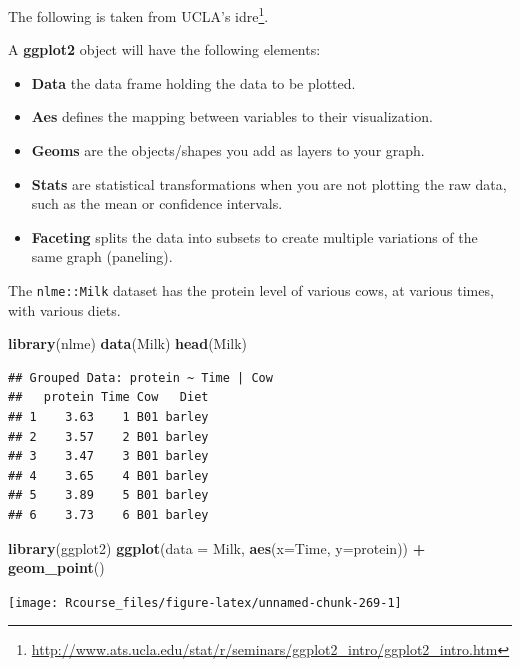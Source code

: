 \documentclass[]{book}
\newenvironment{Shaded}{\begin{snugshade}}{\end{snugshade}}
\newcommand{\DataTypeTok}[1]{\textcolor[rgb]{0.13,0.29,0.53}{#1}}
\newcommand{\KeywordTok}[1]{\textcolor[rgb]{0.13,0.29,0.53}{\textbf{#1}}}
\newcommand{\NormalTok}[1]{#1}
\newcommand{\OperatorTok}[1]{\textcolor[rgb]{0.81,0.36,0.00}{\textbf{#1}}}
\newcommand{\StringTok}[1]{\textcolor[rgb]{0.31,0.60,0.02}{#1}}
\providecommand{\tightlist}{%
  \setlength{\itemsep}{0pt}\setlength{\parskip}{0pt}}
\renewcommand{\href}[2]{#2\footnote{\url{#1}}}
\theoremstyle{definition}
\theoremstyle{definition}
\theoremstyle{definition}
\theoremstyle{remark}
\begin{document}
The following is taken from \href{http://www.ats.ucla.edu/stat/r/seminars/ggplot2_intro/ggplot2_intro.htm}{UCLA's idre}.

A \textbf{ggplot2} object will have the following elements:

\begin{itemize}
\tightlist
\item
  \textbf{Data} the data frame holding the data to be plotted.
\item
  \textbf{Aes} defines the mapping between variables to their visualization.
\item
  \textbf{Geoms} are the objects/shapes you add as layers to your graph.
\item
  \textbf{Stats} are statistical transformations when you are not plotting the raw data, such as the mean or confidence intervals.
\item
  \textbf{Faceting} splits the data into subsets to create multiple variations of the same graph (paneling).
\end{itemize}

The \texttt{nlme::Milk} dataset has the protein level of various cows, at various times, with various diets.

\begin{Shaded}
\begin{Highlighting}[]
\KeywordTok{library}\NormalTok{(nlme)}
\KeywordTok{data}\NormalTok{(Milk)}
\KeywordTok{head}\NormalTok{(Milk)}
\end{Highlighting}
\end{Shaded}

\begin{verbatim}
## Grouped Data: protein ~ Time | Cow
##   protein Time Cow   Diet
## 1    3.63    1 B01 barley
## 2    3.57    2 B01 barley
## 3    3.47    3 B01 barley
## 4    3.65    4 B01 barley
## 5    3.89    5 B01 barley
## 6    3.73    6 B01 barley
\end{verbatim}

\begin{Shaded}
\begin{Highlighting}[]
\KeywordTok{library}\NormalTok{(ggplot2)}
\KeywordTok{ggplot}\NormalTok{(}\DataTypeTok{data =}\NormalTok{ Milk, }\KeywordTok{aes}\NormalTok{(}\DataTypeTok{x=}\NormalTok{Time, }\DataTypeTok{y=}\NormalTok{protein)) }\OperatorTok{+}
\StringTok{  }\KeywordTok{geom_point}\NormalTok{()}
\end{Highlighting}
\end{Shaded}

\texttt{[image: Rcourse\_files/figure-latex/unnamed-chunk-269-1]}
\end{document}
